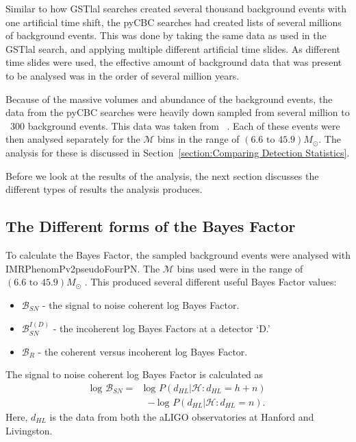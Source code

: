 \documentclass{article}
\begin{document}
  Similar to how GSTlal searches created several thousand background events with one artificial time shift, the pyCBC searches had created lists of several millions of background events. This was done by taking the same data as used in the GSTlal search, and applying multiple different artificial time slides. As different time slides were used, the effective amount of background data that was present to be analysed was in the order of several million years.
  
  
  Because of the massive volumes and abundance of the background events, the data from the pyCBC searches were heavily down sampled from several million to ~300 background events. This data was taken from ~\cite{pyCBCdata}. Each of these events were then analysed separately for the $\mathcal{M}$ bins in the range of $(6.6  \text{ to } 45.9) M_{\odot}$. The analysis for these is discussed in Section~\ref{section:Comparing Detection Statistics}.
  
  Before we look at the results of the analysis, the next section discusses the different types of results the analysis produces.
  
 
  
  

\subsection{The Different forms of the Bayes Factor}
To calculate the Bayes Factor, the sampled background events were analysed with IMRPhenomPv2pseudoFourPN. The $\mathcal{M}$ bins used were in the range of $(6.6  \text{ to } 45.9) M_{\odot}$ . This produced several different useful Bayes Factor values:

\begin{itemize}
	\item  $\mathcal{B}_{SN}$ - the signal to noise coherent log Bayes Factor.
	\item  $\mathcal{B}_{SN}^{I(D)}$ - the incoherent log Bayes Factors at a detector `D.'
	\item  $\mathcal{B}_{R}$ - the coherent versus incoherent log Bayes Factor.
\end{itemize}

The signal to noise coherent log Bayes Factor is calculated as 
\begin{align} \label{eq:logBayesFactor}
\text{log }\mathcal{B}_{SN} =& \text{log }P(d_{HL} | \mathcal{H} : d_{HL} = h + n)  \nonumber\\ 
&\ - \text{log }P(d_{HL} | \mathcal{H} : d_{HL} =  n) .
\end{align}
Here, $d_{HL}$ is the data from both the aLIGO observatories at Hanford and Livingston. \\
\end{document}
